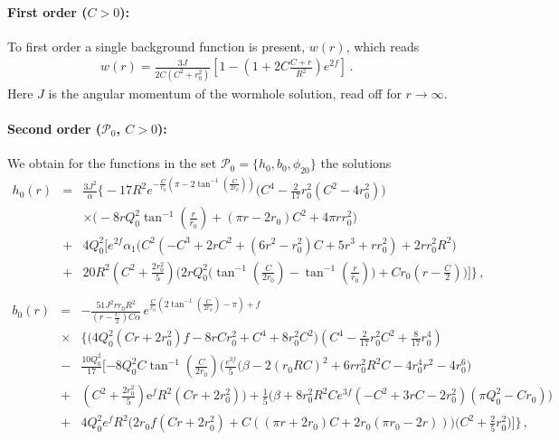 \documentclass[aps,prd,12pt,superscriptaddress]{revtex4-2}
\begin{document}
\paragraph{First order ($C > 0$):}
To first order a single background function is present, $w(r)$, which reads
\begin{eqnarray}
    w(r)= \frac{3J}{2C(C^2+r_0^2)}
    \left[
    1 - \left(
    1+2C\frac{C+r}{R^2}
    \right)e^{2f}
    \right] \, . \, \, \, \, \, \, \, \,
    \label{wr}
\end{eqnarray}
Here $J$ is the angular momentum of the wormhole solution, read off for $r \to \infty$.

\paragraph{Second order ($\mathcal{P}_0$, $C > 0$):}
We obtain for the functions in the set $\mathcal{P}_0=\{h_0,{b_0},\phi_{20}\}$ the solutions
\begin{eqnarray}
  h_0(r) &=& \frac{ 3 J^2 }{ \alpha}
  \big\{
  -17 R^2   e^{-\frac{C}{r_0}\left(\pi-2 \tan^{-1} \left(\frac{C}{2 r_0}\right)\right)}
  \big(C^4-\frac{2}{17} r_0^2 (C^2 -4r_0^2 )\big) 
  \nonumber 
  \\ && \times
 \big(-8r Q_0^2 \tan^{-1} \left(\frac{r}{r_0}\right) + (\pi r - 2 r_0)C^2 + 4\pi r r_0^2 \big) 
  \nonumber 
  \\ 
 & +& 4 Q_0^2  
  \big[ e^{2f}  
\alpha_1
  \big(C^2(-C^3+2rC^2+(6r^2-r_0^2)C+ 5r^3+rr_0^2) + 2rr_0^2 R^2\big)
     \nonumber 
  \\ 
 & +& 20 R^2 \left(C^2+\frac{2r_0^2}{5}\right) 
  \big( 2 r Q_0^2 \big(\tan^{-1} \left(\frac{C}{2r_0}\right) - \tan^{-1} \left(\frac{r}{r_0}\right) \big) 
  + Cr_0 \left(r-\frac{C}{2}\right) \big)
  \big]
  \big\} \, ,
  \nonumber 
  \\
  \label{h0_withc}
\end{eqnarray}
\begin{eqnarray}
    b_0(r) &=&
 -
 \frac{51 J^2 r r_0 R^{2}}{ \left(r -\frac{{C}}{2}\right) {C} \alpha}
 \, {e}^{\frac{ {C}   }{{r_0}} (2 \tan^{-1} \left(\frac{{C}}{2 r_0}\right)- \pi) + f}
\nonumber 
 \\ 
& \times &
 \big\{ 
\big(4 Q_0^{2} ({C} r +2 r_0^{2}) f -8 r {C} r_0^{2}+{C}^{4}+8 r_0^{2} {C}^{2} \big) 
\left({C}^{4}-\frac{2}{17} r_0^{2} {C}^{2}+\frac{8}{17} r_0^{4} \right) 
\nonumber 
\\ 
&-& \frac{10 Q_0^{2}}{17}
[
-8 Q_0^{2}
{C} \tan^{-1}  \left(\frac{{C}}{2 r_0}\right)
\big(\frac{{ e}^{3 f }}{5} 
\big(\beta 
- 
2 (r_0 RC)^{2} 
+6 r r_0^{2} R^{2} {C}
-4 r_0^{4} r^{2}-4 r_0^{6} \big) 
\nonumber 
\\    
&+&\left({C}^{2}+\frac{2 r_0^{2}}{5} \right) {\mathrm e}^{f } R^{2} ({C} r +2 r_0^{2}) \big) 
+\frac{1}{5}
\big(
\beta +
8  r_0^{2} R^{2} C  {e}^{3 f } (
-   {C}^{2}+ 3   r{C} 
-2  r_0^{2}  )
 ( \pi  Q_0^{2}- {C} r_0 )
\big)
\nonumber 
\\ 
&+& 
4 Q_0^{2} {e}^{f } R^{2}
\big(2{r_0}f( {C} r  +2 r_0^{2})  + C ((\pi  r +2  {r_0} ) {C} +2 r_0( \pi  r_0- 2r ) )  \big) 
\big({C}^{2}+\frac{2 }{5} r_0^{2} \big) 
]
\big \} \, ,
\label{b0_withc}
\end{eqnarray}
\end{document}
